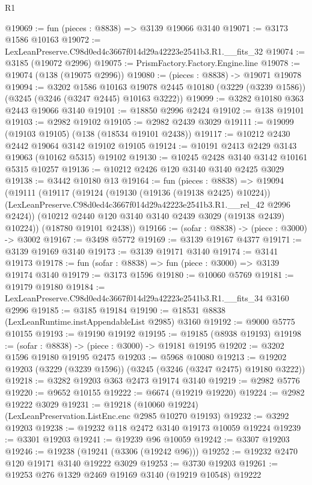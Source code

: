 \begin{lexlean}{R1}
\begin{coremodule}
@19069 := fun (pieces : @8838) => @3139 @19066 @3140
@19071 := @3173 @1586 @10163
@19072 := LexLeanPreserve.C98d0ed4c3667f014d29a42223e2541b3.R1.__fits_32
@19074 := @3185 (@19072 @2996)
@19075 := PrismFactory.Factory.Engine.line
@19078 := @19074 (@138 (@19075 @2996))
@19080 := (pieces : @8838) -> @19071 @19078
@19094 := @3202
    @1586
    @10163
    @19078
    @2445
    @10180
    (@3229 (@3239 @1586))
    (@3245 (@3246 (@3247 @2445) @10163 @3222))
@19099 := @3282 @10180 @363 @2443 @19066 @3140
@19101 := @18850 @2996 @2424
@19102 := @138 @19101
@19103 := @2982 @19102
@19105 := @2982 @2439 @3029
@19111 := @19099 (@19103 @19105) (@138 (@18534 @19101 @2438))
@19117 := @10212 @2430 @2442 @19064 @3142 @19102 @19105
@19124 := @10191 @2413 @2429 @3143 @19063 (@10162 @5315) @19102
@19130 := @10245 @2428 @3140 @3142 @10161 @5315 @10257
@19136 := @10212 @2426 @120 @3140 @3140 @2425 @3029
@19138 := @3442 @10180 @13
@19164 := fun (pieces : @8838) =>
  @19094
    (@19111
      (@19117
        (@19124
          (@19130 (@19136 (@19138 @2425) @10224))
          (LexLeanPreserve.C98d0ed4c3667f014d29a42223e2541b3.R1.__rel_42 @2996 @2424))
        (@10212 @2440 @120 @3140 @3140 @2439 @3029 (@19138 @2439) @10224))
      (@18780 @19101 @2438))
@19166 := (sofar : @8838) -> (piece : @3000) -> @3002
@19167 := @3498 @5772
@19169 := @3139 @19167 @4377
@19171 := @3139 @19169 @3140
@19173 := @3139 @19171 @3140
@19174 := @3141 @19173
@19178 := fun (sofar : @8838) => fun (piece : @3000) => @3139 @19174 @3140
@19179 := @3173 @1596
@19180 := @10060 @5769
@19181 := @19179 @19180
@19184 := LexLeanPreserve.C98d0ed4c3667f014d29a42223e2541b3.R1.__fits_34 @3160 @2996
@19185 := @3185 @19184
@19190 := @18531 @8838 (LexLeanRuntime.instAppendableList @2985) @3160
@19192 := @9000 @5775 @10155
@19193 := @19190 @19192
@19195 := @19185 (@8938 @19193)
@19198 := (sofar : @8838) -> (piece : @3000) -> @19181 @19195
@19202 := @3202 @1596 @19180 @19195 @2475
@19203 := @5968 @10080
@19213 := @19202 @19203 (@3229 (@3239 @1596)) (@3245 (@3246 (@3247 @2475) @19180 @3222))
@19218 := @3282 @19203 @363 @2473 @19174 @3140
@19219 := @2982 @5776
@19220 := @9652 @10155
@19222 := @6674 (@19219 @19220)
@19224 := @2982 @19222 @3029
@19231 := @19218 (@10060 @19224) (LexLeanPreservation.ListEnc.enc @2985 @10270 @19193)
@19232 := @3292 @19203
@19238 := @19232 @118 @2472 @3140 @19173 @10059 @19224
@19239 := @3301 @19203
@19241 := @19239 @96 @10059
@19242 := @3307 @19203
@19246 := @19238 (@19241 (@3306 (@19242 @96)))
@19252 := @19232 @2470 @120 @19171 @3140 @19222 @3029
@19253 := @3730 @19203
@19261 := @19253 @276 @1329 @2469 @19169 @3140 (@19219 @10548) @19222

\end{coremodule}
\end{lexlean}

